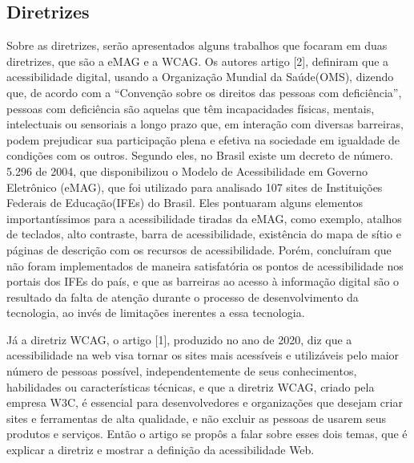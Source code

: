 \documentclass[a4paper]{article}
\begin{document}
\begin{titlepage}
\subsection{Diretrizes}
Sobre as diretrizes, serão apresentados alguns trabalhos que focaram em duas diretrizes, que são a eMAG e a WCAG. Os autores artigo [2], definiram que a acessibilidade digital, usando a Organização Mundial da Saúde(OMS), dizendo que, de acordo com a “Convenção sobre os direitos das pessoas com deficiência”, pessoas com deficiência são aquelas que têm incapacidades físicas, mentais, intelectuais ou sensoriais a longo prazo que, em interação com diversas barreiras, podem prejudicar sua participação plena e efetiva na sociedade em igualdade de condições com os outros. Segundo eles, no Brasil existe um decreto de número. 5.296 de 2004, que disponibilizou o Modelo de Acessibilidade em Governo Eletrônico (eMAG), que foi utilizado para analisado 107 sites de Instituições Federais de Educação(IFEs) do Brasil. Eles pontuaram alguns elementos importantíssimos para a acessibilidade tiradas da eMAG, como exemplo, atalhos de teclados, alto contraste, barra de acessibilidade, existência do mapa de sítio e páginas de descrição com os recursos de acessibilidade. Porém, concluíram que não foram implementados de maneira satisfatória os pontos de acessibilidade nos portais dos IFEs do país, e que as barreiras ao acesso à informação digital são o resultado da falta de atenção durante o processo de desenvolvimento da tecnologia, ao invés de limitações inerentes a essa tecnologia.

Já a diretriz WCAG, o artigo [1], produzido no ano de 2020, diz que a acessibilidade na web visa tornar os sites mais acessíveis e utilizáveis pelo maior número de pessoas possível, independentemente de seus conhecimentos, habilidades ou características técnicas, e que a diretriz WCAG, criado pela empresa W3C, é essencial para desenvolvedores e organizações que desejam criar sites e ferramentas de alta qualidade, e não excluir as pessoas de usarem seus produtos e serviços. Então o artigo se propôs a falar sobre esses dois temas, que é explicar a diretriz e mostrar a definição da acessibilidade Web.


\end{titlepage}
\end{document}
